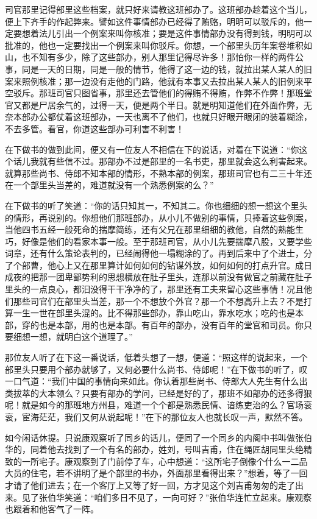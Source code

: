 \documentclass[12pt,UTF8]{ctexbook}
\begin{document}
{{{司官那里记得部里这些档案，就只好来请教这班部办了。这班部办趁着这个当儿，便上下齐手的作起弊来。譬如这件事情部办已经得了贿赂，明明可以驳斥的，他一定要想着法儿引出一个例案来叫你核准；要是这件事情部办没有得到钱，明明可以批准的，他也一定要找出一个例案来叫你驳斥。你想，一个部里头历年案卷堆积如山，也不知有多少，除了这些部办，别人那里记得尽许多！那怕你一样的两件公事，同是一天的日期，同是一般的情节，他得了这一边的钱，就拉出某人某人的旧案来照例核准；那一边没有走他的门路，他就有本事又去拉出某人某人的旧例来平空驳斥。那班司官只图省事，那里还去管他们的得贿不得贿，作弊不作弊！那班堂官又都是尸居余气的，过得一天，便是两个半日。就是明知道他们在外面作弊，无奈本部办公都仗着这班部办，一天也离不了他们，也就只好眼开眼闭的装着糊涂，不去多管。看官，你道这些部办可利害不利害！

在下做书的做到此间，便又有一位友人不相信在下的说话，对着在下说道：“你这个话儿我就有些信不过。那部办不过是部里的一名书吏，那里就会这么利害起来。就算那些尚书、侍郎不知本部的情形，不熟本部的例案，那班司官也有二三十年还在一个部里头当差的，难道就没有一个熟悉例案的么？”

在下做书的听了笑道：“你的话只知其一，不知其二。你也细细的想一想这个里头的情形，再说别的。你想他们那班部办，从小儿不做别的事情，只捧着这些例案，当他四书五经一般死命的揣摩简练，还有父兄在那里细细的教他，自然的熟能生巧，好像是他们的看家本事一般。至于那班司官，从小儿先要揣摩八股，又要学些词章，还有什么策论表判的，已经闹得他一塌糊涂的了。再到后来中了个进士，分了个部曹，他心上又在那里算计如何如何的钻谋外放，如何如何的打点升官。成日成夜的把那一团卑鄙势利的思想横放在肚子里头，连那以前没有做官之前藏在肚子里头的一点良心，都汩没得干干净净的了，那里还有工夫来留心这些事情！况且他们那些司官们在部里头当差，那一个不想放个外官？那一个不想高升上去？不是打算一生一世在部里头混的。比不得那些部办，靠山吃山，靠水吃水；吃的也是本部，穿的也是本部，用的也是本部。有百年的部办，没有百年的堂官和司员。你只要细想一想，就明白这个道理了。”

那位友人听了在下这一番说话，低着头想了一想，便道：“照这样的说起来，一个部里头只要用个部办就够了，又何必要什么尚书、侍郎呢！”在下做书的听了，叹一口气道：“我们中国的事情向来如此。你认着那些尚书、侍郎大人先生有什么出类拔萃的大本领么？只要有部办的学问，已经是好的了，那班不如部办的还多得狠呢！就是如今的那班地方州县，难道一个个都是熟悉民情、谙练吏治的么？官场衮衮，宦海茫茫，我们又何从说起呢！”在下的那位友人也就长叹一声，默然不答。

如今闲话休提。只说康观察听了同乡的话儿，便同了一个同乡的内阁中书叫做张伯华的，同着他去找到了一个有名的部办，姓刘，号叫吉甫，住在绳匠胡同里头绝精致的一所宅子。康观察到了门前停了车，心中想道：“这所宅子倒像个什么一二品大员的住宅，若不讲明了是个部里的书办，外面那里看得出来？”想着，等了一回才请了他们进去；在一个客厅上又等了好一回，方才见这个刘吉甫匆匆的走了出来。见了张伯华笑道：“咱们多日不见了，一向可好？”张伯华连忙立起来。康观察也跟着和他客气了一阵。

}}}
\end{document}
